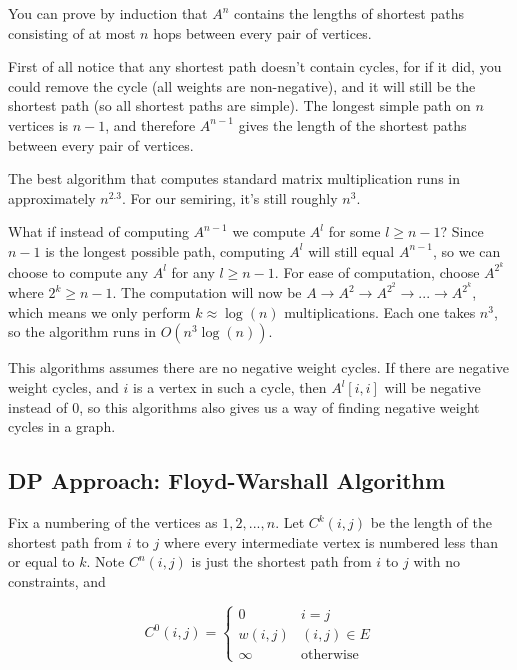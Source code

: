 You can prove by induction that $A^n$ contains the lengths
of shortest paths consisting of at most $n$ hops between every 
pair of vertices.

First of all notice that any shortest path doesn't contain cycles, for
if it did, you could remove the cycle (all weights are non-negative),
and it will still be the shortest path (so all shortest paths
are simple). The longest simple path on $n$ vertices is
$n - 1$, and therefore $A^
{n-1}$ gives the length of the shortest
paths between every pair of vertices.

The best algorithm that computes standard matrix multiplication
runs in approximately $n^{2.3}$. For our semiring, it's still
roughly $n^3$.

What if instead of computing $A^{n-1}$ we compute $A^l$ for some
$l \geq n - 1$? Since $n - 1$ is the longest possible path, computing
$A^l$ will still equal $A^{n-1}$, so we can choose to compute any
$A^l$ for any $l \geq n - 1$. For ease of computation, choose
$A^{2^k}$ where $2^k \geq n - 1$. The computation will now be
$A \to A^2 \to A^{2^2} \to ... \to A^{2^k}$, which means
we only perform $k \approx \log(n)$ multiplications. Each one
takes $n^3$, so the algorithm runs in $O(n^3\log(n))$.


This algorithms assumes there are no negative weight cycles.
If there are negative weight cycles, and $i$ is a vertex in such a
cycle, then $A^l[i, i]$ will be negative instead of 0, so this
algorithms also gives us a way of finding negative weight cycles in a
graph.

\subsection{DP Approach: Floyd-Warshall Algorithm}

Fix a numbering of the vertices as $1, 2, ..., n$.
Let $C^k(i, j)$ be the length of the shortest path from $i$ to $j$
where every intermediate vertex is numbered less than or equal to $k$.
Note $C^n(i, j)$ is just the shortest path from $i$ to $j$ with no
constraints, and


\begin{equation*}
    C^0(i, j) =
    \begin{cases}
    0 & i = j \\
    w(i, j) & (i, j) \in E \\
    \infty & \text{otherwise}
    \end{cases}
\end{equation*}

